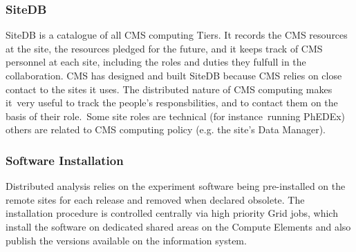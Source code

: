 \subsubsection{ SiteDB }
\label{sec:4_1_2}
SiteDB is a catalogue of all CMS computing Tiers. It records the CMS resources at the site, the resources pledged for the future, and it keeps track of CMS personnel at each site, including the roles and duties they fulfull in the collaboration.
CMS has designed and built SiteDB because CMS relies on close contact to the sites it uses. The distributed nature of CMS computing makes it very useful to track the people's responsbilities, and to contact them on the basis of their role. Some site roles are technical (for instance running PhEDEx) others are related to CMS computing policy (e.g. the site's Data Manager). 

\subsubsection{ Software Installation }
\label{sec:4_1_3}
Distributed analysis relies on the experiment software being pre-installed on the remote
sites for each release and removed when declared obsolete. 
The installation procedure is controlled centrally via high priority Grid jobs, which install the software on dedicated shared areas on the Compute Elements and also publish the versions available on the information system.

